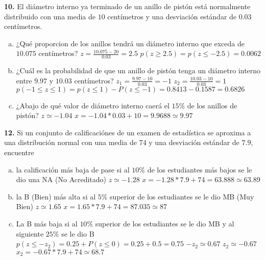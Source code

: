 \documentclass[12pt, letterpaper]{article}
\begin{document}
    \textbf{10. }El diámetro interno ya terminado de un anillo de pistón está normalmente distribuido con una media de $10$
    centímetros y una desviación estándar de $0.03$ centímetros.
    \begin{enumerate}[a)]
        \item ¿Qué proporcion de los anillos tendrá un diámetro interno que exceda de $10.075$ centímetros?\vskip0.5cm
        $z=\displaystyle\frac{10.075-20}{0.03}=2.5$\vskip0.5cm
        $p(z\geq 2.5)=p(z\leq -2.5)=0.0062$
        \item ¿Cuál es la probabilidad de que un anillo de pistón tenga un diámetro interno entre $9.97$ y $10.03$
        centímetros?\vskip0.5cm
        $z_1=\displaystyle\frac{9.97-10}{0.03}=-1$\vskip0.5cm
        $z_2=\displaystyle\frac{10.03-10}{0.03}=1$\vskip0.5cm
        $p(-1\leq z\leq 1)=p(z\leq 1)-P(z\leq -1)=0.8413-0.1587=0.6826$
        \item ¿Abajo de qué valor de diámetro interno caerá el $15\%$ de los anillos de pistón?\vskip0.5cm
        $z\simeq -1.04$\vskip0.5cm
        $x=-1.04*0.03+10=9.9688\simeq 9.97$
    \end{enumerate}\vskip1cm

    \textbf{12. }Si un conjunto de calificaciónes de un examen de estadística se aproxima a una distribución normal con
    una media de $74$ y una desviación estándar de $7.9$, encuentre
    \begin{enumerate}[a)]
        \item la calificación más baja de pase si al $10\%$ de los estudiantes más bajos se le dio una NA (No Acreditado)\vskip0.5cm
        $z\simeq -1.28$\vskip0.5cm
        $x=-1.28*7.9+74=63.888\simeq 63.89$\vskip0.5cm
        \item la B (Bien) más alta si al $5\%$ superior de los estudiantes se le dio MB (Muy Bien)\vskip0.5cm
        $z\simeq 1.65$\vskip0.5cm
        $x=1.65*7.9+74=87.035\simeq 87$
        \item La B más baja si al $10\%$ superior de los estudiantes se le dio MB y al siguiente $25\%$ se le dio B\vskip0.5cm
        $p(z\leq -z_2)=0.25+P(z\leq 0)=0.25+0.5=0.75$\vskip0.5cm
        $-z_2 \simeq 0.67$\vskip0.5cm
        $z_2 \simeq -0.67$\vskip0.5cm
        $x_2=-0.67*7.9+74\simeq 68.7$

    \end{enumerate}\vskip1cm
\end{document}
